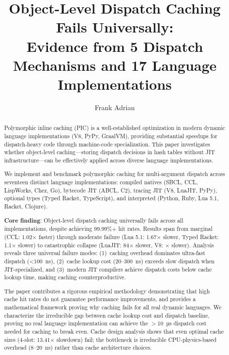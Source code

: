 \documentclass[sigplan,final]{acmart}
\begin{document}
\title{Object-Level Dispatch Caching Fails Universally: \\
  Evidence from 5 Dispatch Mechanisms and 17 Language Implementations}

\author{Frank Adrian}

\begin{abstract}
  Polymorphic inline caching (PIC) is a well-established optimization in modern dynamic language
  implementations (V8, PyPy, GraalVM), providing substantial speedups for dispatch-heavy code
  through machine-code specialization. This paper investigates whether object-level caching—storing
  dispatch decisions in hash tables without JIT infrastructure—can be effectively applied across
  diverse language implementations.

  We implement and benchmark polymorphic caching for multi-argument dispatch across seventeen
  distinct language implementations: compiled natives (SBCL, CCL, LispWorks, Chez, Go), bytecode JIT
  (ABCL, C2), tracing JIT (V8, LuaJIT, PyPy), optional types (Typed Racket, TypeScript), and interpreted
  (Python, Ruby, Lua 5.1, Racket, Clojure).

  \textbf{Core finding}: Object-level dispatch caching universally fails across all implementations,
  despite achieving 99.99\%+ hit rates. Results span from marginal (CCL: 1.02× faster) through
  moderate failure (Lua 5.1: 1.67× slower, Typed Racket: 1.1× slower) to catastrophic collapse
  (LuaJIT: 84× slower, V8: \infty× slower). Analysis reveals three universal failure modes: (1)~caching
  overhead dominates ultra-fast dispatch (<100~ns), (2)~cache lookup cost (20--300~ns) exceeds
  slow dispatch when JIT-specialized, and (3)~modern JIT compilers achieve dispatch costs below
  cache lookup time, making caching counterproductive.

  The paper contributes a rigorous empirical methodology demonstrating that high cache hit rates
  do not guarantee performance improvements, and provides a mathematical framework proving why
  caching fails for all real dynamic languages. We characterize the irreducible gap between cache
  lookup cost and dispatch baseline, proving no real language implementation can achieve the
  $>$10~µs dispatch cost needed for caching to break even. Cache design analysis shows that even
  optimal cache sizes (4-slot: 13.41× slowdown) fail; the bottleneck is irreducible CPU-physics-based
  overhead (8--20~ns) rather than cache architecture choices.
\end{abstract}
\end{document}
